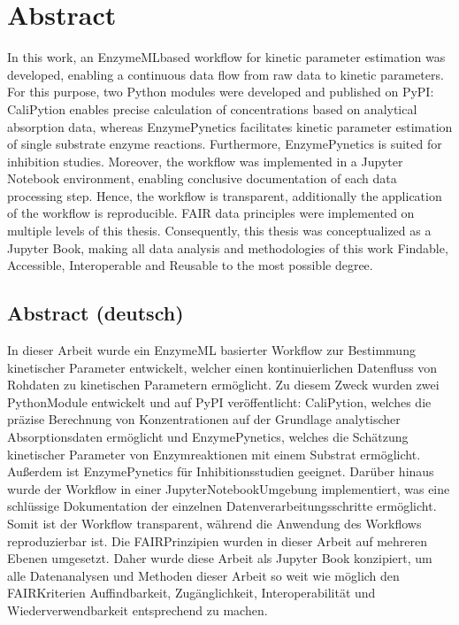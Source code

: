 \documentclass[letterpaper,12pt,english]{jupyterBook}
\begin{document}
\chapter*{Abstract}
\sphinxAtStartPar
In this work, an EnzymeML\sphinxhyphen{}based workflow for kinetic parameter estimation was developed, enabling a continuous data flow from raw data to kinetic parameters.
For this purpose, two Python modules were developed and published on PyPI: CaliPytion enables precise calculation of concentrations based on analytical absorption data, whereas EnzymePynetics facilitates kinetic parameter estimation of single substrate enzyme reactions. Furthermore, EnzymePynetics is suited for inhibition studies.
Moreover, the workflow was implemented in a Jupyter Notebook environment, enabling conclusive documentation of each data processing step. Hence, the workflow is transparent, additionally the application of the workflow is reproducible. FAIR data principles were implemented on multiple levels of this thesis. Consequently, this thesis was conceptualized as a Jupyter Book, making all data analysis and methodologies of this work Findable, Accessible, Interoperable and Reusable to the most possible degree.


\section*{Abstract (deutsch)}
\label{\detokenize{abstract:abstract-deutsch}}
\sphinxAtStartPar
In dieser Arbeit wurde ein EnzymeML basierter Workflow zur Bestimmung kinetischer Parameter entwickelt, welcher einen kontinuierlichen Datenfluss von Rohdaten zu kinetischen Parametern ermöglicht.
Zu diesem Zweck wurden zwei Python\sphinxhyphen{}Module entwickelt und auf PyPI veröffentlicht: CaliPytion, welches die präzise Berechnung von Konzentrationen auf der Grundlage analytischer Absorptionsdaten ermöglicht und EnzymePynetics, welches die Schätzung kinetischer Parameter von Enzymreaktionen mit einem Substrat ermöglicht. Außerdem ist EnzymePynetics für Inhibitionsstudien geeignet.
Darüber hinaus wurde der Workflow in einer Jupyter\sphinxhyphen{}Notebook\sphinxhyphen{}Umgebung implementiert, was eine schlüssige Dokumentation der einzelnen Datenverarbeitungsschritte ermöglicht. Somit ist der Workflow transparent, während die Anwendung des Workflows reproduzierbar ist. Die FAIR\sphinxhyphen{}Prinzipien wurden in dieser Arbeit auf mehreren Ebenen umgesetzt. Daher wurde diese Arbeit als Jupyter Book konzipiert, um alle Datenanalysen und Methoden dieser Arbeit so weit wie möglich den FAIR\sphinxhyphen{}Kriterien Auffindbarkeit, Zugänglichkeit, Interoperabilität und Wiederverwendbarkeit entsprechend zu machen.
\end{document}
